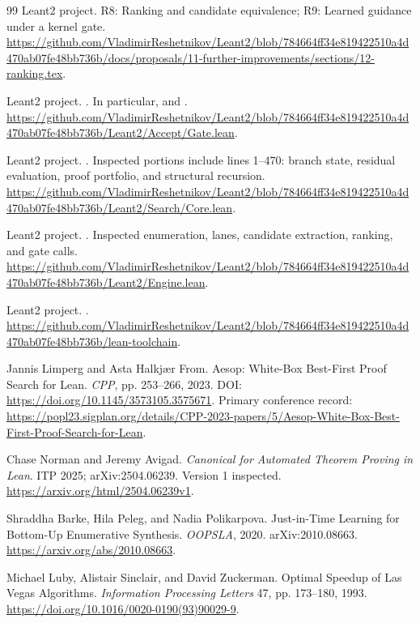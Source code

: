 \documentclass[11pt,a4paper]{article}
\newcommand{\code}[1]{\texttt{\detokenize{#1}}}
\theoremstyle{definition}
\theoremstyle{remark}
\begin{document}
\begin{thebibliography}{99}
Leant2 project. R8: Ranking and candidate equivalence; R9: Learned guidance under a kernel gate.
\url{https://github.com/VladimirReshetnikov/Leant2/blob/784664ff34e819422510a4d470ab07fe48bb736b/docs/proposals/11-further-improvements/sections/12-ranking.tex}.

Leant2 project. . In particular, \code{kernelCheckAndAudit} and \code{gate}.
\url{https://github.com/VladimirReshetnikov/Leant2/blob/784664ff34e819422510a4d470ab07fe48bb736b/Leant2/Accept/Gate.lean}.

Leant2 project. . Inspected portions include lines 1--470: branch state, residual evaluation, proof portfolio, and structural recursion.
\url{https://github.com/VladimirReshetnikov/Leant2/blob/784664ff34e819422510a4d470ab07fe48bb736b/Leant2/Search/Core.lean}.

Leant2 project. . Inspected enumeration, lanes, candidate extraction, ranking, and gate calls.
\url{https://github.com/VladimirReshetnikov/Leant2/blob/784664ff34e819422510a4d470ab07fe48bb736b/Leant2/Engine.lean}.

Leant2 project. .
\url{https://github.com/VladimirReshetnikov/Leant2/blob/784664ff34e819422510a4d470ab07fe48bb736b/lean-toolchain}.

Jannis Limperg and Asta Halkj\ae r From.
Aesop: White-Box Best-First Proof Search for Lean.
\emph{CPP}, pp. 253--266, 2023. DOI: \url{https://doi.org/10.1145/3573105.3575671}.
Primary conference record:
\url{https://popl23.sigplan.org/details/CPP-2023-papers/5/Aesop-White-Box-Best-First-Proof-Search-for-Lean}.

Chase Norman and Jeremy Avigad.
\emph{Canonical for Automated Theorem Proving in Lean}.
ITP 2025; arXiv:2504.06239. Version 1 inspected.
\url{https://arxiv.org/html/2504.06239v1}.

Shraddha Barke, Hila Peleg, and Nadia Polikarpova.
Just-in-Time Learning for Bottom-Up Enumerative Synthesis.
\emph{OOPSLA}, 2020. arXiv:2010.08663.
\url{https://arxiv.org/abs/2010.08663}.

Michael Luby, Alistair Sinclair, and David Zuckerman.
Optimal Speedup of Las Vegas Algorithms.
\emph{Information Processing Letters} 47, pp. 173--180, 1993.
\url{https://doi.org/10.1016/0020-0190(93)90029-9}.


\end{thebibliography}
\end{document}
